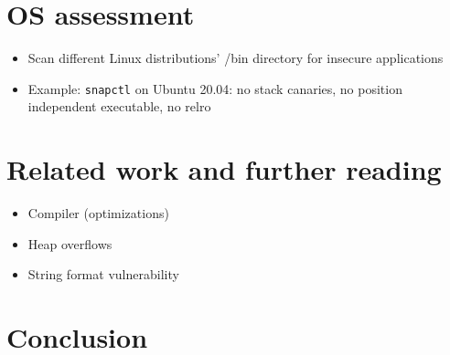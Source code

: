 \chapter{OS assessment}
\label{chp:os-assessment}

\begin{itemize}
	\item{Scan different Linux distributions' /bin directory for insecure applications}
	\item{Example: \texttt{snapctl} on Ubuntu 20.04: no stack canaries, no position independent executable, no \gls{relro}}
\end{itemize}
%

\chapter{Related work and further reading}
\label{chp:related-work}

\begin{itemize}
	\item{Compiler (optimizations)}
	\item{Heap overflows}
	\item{String format vulnerability}
\end{itemize}

\chapter{Conclusion}
\label{chp:conclusion}